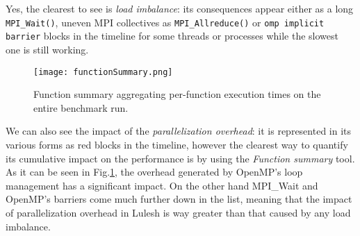 \documentclass{article}
\begin{document}
\begin{enumerate}
	Yes, the clearest to see is \emph{load imbalance}: its consequences appear either as a long \verb!MPI_Wait()!, uneven MPI collectives as \verb!MPI_Allreduce()! or \verb!omp implicit barrier! blocks in the timeline for some threads or processes while the slowest one is still working.

	\begin{figure}[p] %
		\begin{center}
			\texttt{[image: functionSummary.png]}
		\cprotect\caption{Function summary aggregating per-function execution times on the entire benchmark run.}
		\label{fig:functionSummary}
		\end{center}
	\end{figure}

	We can also see the impact of the \emph{parallelization overhead}: it is represented in its various forms as red blocks in the timeline, however the clearest way to quantify its cumulative impact on the performance is by using the \emph{Function summary} tool. As it can be seen in Fig.\ref{fig:functionSummary}, the overhead generated by OpenMP's loop management has a significant impact. On the other hand MPI\_Wait and OpenMP's barriers come much further down in the list, meaning that the impact of parallelization overhead in Lulesh is way greater than that caused by any load imbalance.
\end{enumerate}

\end{document}
